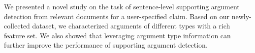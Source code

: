 We presented a novel study on the task of sentence-level supporting argument detection from relevant documents for a user-specified claim. Based on our newly-collected dataset, we characterized arguments of different types with a rich feature set. We also showed that leveraging argument type information can further improve the performance of supporting argument detection.





